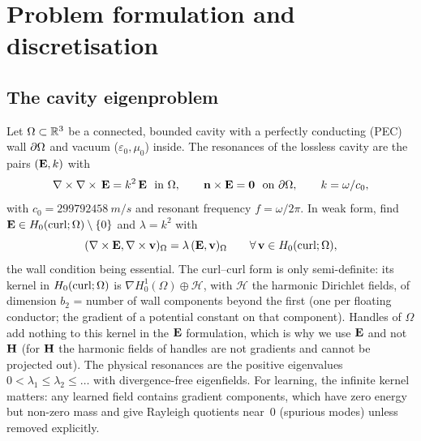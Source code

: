 \section{Problem formulation and discretisation}\label{sec:formulation}

\subsection{The cavity eigenproblem}\label{sec:03-eigenproblem}
Let $\Omega\subset\mathbb{R}^3$ be a connected, bounded cavity with a perfectly conducting (PEC) wall $\partial\Omega$ and vacuum
($\varepsilon_0,\mu_0$) inside. The resonances of the lossless cavity are the pairs $(\mathbf{E},k)$ with
\begin{equation}\label{eq:03-strong}
  \nabla\times\nabla\times\,\mathbf{E} = k^2\,\mathbf{E} \ \text{ in } \Omega,\qquad \mathbf n\times\mathbf{E}=\mathbf 0 \ \text{ on } \partial\Omega,
  \qquad k=\omega/c_0 ,
\end{equation}
with $c_0=\SI{299792458}{m/s}$ %
and resonant frequency $f=\omega/2\pi$. In weak form, find $\mathbf{E}\in H_0(\mathrm{curl};\Omega)\setminus\{0\}$ and $\lambda=k^2$ with
\begin{equation}\label{eq:03-weak}
  (\nabla\times\mathbf{E},\nabla\times\mathbf v)_\Omega=\lambda\,(\mathbf{E},\mathbf v)_\Omega\qquad\forall\,\mathbf v\in H_0(\mathrm{curl};\Omega) ,
\end{equation}
the wall condition being essential. The curl--curl form is only semi-definite: its kernel in $H_0(\mathrm{curl};\Omega)$ is
$\nabla H^1_0(\Omega)\oplus\mathcal H$, with $\mathcal H$ the harmonic Dirichlet fields, of dimension $b_2$ = number of wall components beyond the first (one per floating conductor; the
gradient of a potential constant on that component). %
Handles of $\Omega$ add nothing to this kernel in the $\mathbf{E}$ formulation, which is why we use $\mathbf{E}$ and not $\mathbf{H}$ (for $\mathbf{H}$ the harmonic fields
of handles are not gradients and cannot be projected out). %
The physical resonances are the positive eigenvalues $0<\lambda_1\le\lambda_2\le\dots$ with divergence-free eigenfields. For learning, the infinite kernel matters: any learned field contains
gradient components, which have zero energy but non-zero mass and give Rayleigh quotients near~$0$ (spurious modes) unless removed explicitly.

